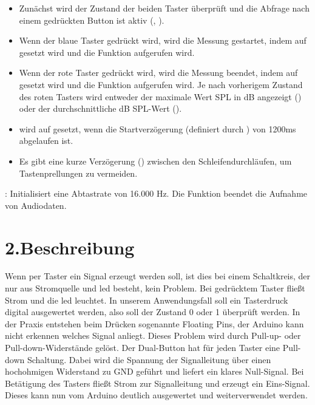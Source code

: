 \begin{itemize}
    \item Zunächst wird der Zustand der beiden Taster überprüft und die Abfrage nach einem gedrückten Button ist aktiv (, ).
    \item Wenn der blaue Taster gedrückt wird, wird die Messung gestartet, indem  auf  gesetzt wird und die Funktion  aufgerufen wird.
    \item Wenn der rote Taster gedrückt wird, wird die Messung beendet, indem  auf  gesetzt wird und die Funktion  aufgerufen wird. Je nach vorherigem Zustand des roten Tasters wird entweder der maximale Wert SPL in dB angezeigt () oder der durchschnittliche dB SPL-Wert ().
    \item {} wird auf  gesetzt, wenn die Startverzögerung (definiert durch ) von 1200ms abgelaufen ist.
    \item Es gibt eine kurze Verzögerung () zwischen den Schleifendurchläufen, um Tastenprellungen zu vermeiden.
\end{itemize} 


: Initialisiert eine Abtastrate von 16.000 Hz.
Die Funktion  beendet die Aufnahme von Audiodaten.



\section{2.Beschreibung}

Wenn per Taster ein Signal erzeugt werden soll, ist dies bei einem Schaltkreis, der nur aus Stromquelle und \ac{led} besteht, kein Problem. Bei gedrücktem Taster fließt Strom und die \ac{led} leuchtet. In unserem Anwendungsfall soll ein Tasterdruck digital ausgewertet werden, also soll der Zustand 0 oder 1 überprüft werden. In der Praxis entstehen beim Drücken sogenannte Floating Pins, der Arduino kann nicht erkennen welches Signal anliegt. Dieses Problem wird durch Pull-up- oder Pull-down-Widerstände gelöst. Der Dual-Button hat für jeden Taster eine Pull-down Schaltung. Dabei wird die Spannung der Signalleitung über einen hochohmigen Widerstand zu GND geführt und liefert ein klares Null-Signal. Bei Betätigung des Tasters fließt Strom zur Signalleitung und erzeugt ein Eins-Signal. Dieses kann nun vom Arduino deutlich ausgewertet und weiterverwendet werden.




